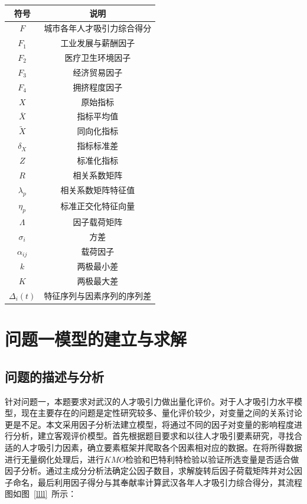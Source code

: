 \documentclass{whutmod}
\begin{document}
	\begin{table}[H]
	\label{biao} \centering
		\begin{tabular}{cc}
			\toprule[1.5pt]
			\multicolumn{1}{m{5cm}}{\centering 符号} & \multicolumn{1}{m{5cm}}{\centering 说明} \\
			\midrule[1pt]
			$F$	 &  城市各年人才吸引力综合得分  \\ 
			$F_{1}$ &  工业发展与薪酬因子 \\ 
			$F_{2}$	 &  医疗卫生环境因子 \\ 
			$F_{3}$  &  经济贸易因子 \\ 
			$F_{4}$  &  拥挤程度因子 \\ 
			$X$  &  原始指标 \\ 
			$\overline{X}$  &  指标平均值 \\ 
			$\widetilde{X}$  &  同向化指标 \\ 
	     	$\delta_{X}$  &  指标标准差 \\ 
	     	$Z$  & 标准化指标 \\ 
	     	$R$  & 相关系数矩阵 \\ 
	     	$\lambda_{p}$  & 相关系数矩阵特征值 \\ 
	     	$\eta _ {p}$  & 标准正交化特征向量 \\ 
	     	$\Lambda$ & 因子载荷矩阵 \\ 
	     	$\sigma_{i}$ & 方差 \\
	     	$\alpha_{i j}$ & 载荷因子 \\
	     	$k$ & 两极最小差 \\
	     	$K$ & 两极最大差 \\
	     	$\Delta _{i}(t)$ & 特征序列与因素序列的序列差 \\
			\bottomrule[1.5pt]
		\end{tabular}
	\end{table}

	\section{问题一模型的建立与求解}
	\subsection{问题的描述与分析}

	针对问题一，本题要求对武汉的人才吸引力做出量化评价。对于人才吸引力水平模型，现在主要存在的问题是定性研究较多、量化评价较少，对变量之间的关系讨论更是不足。本文采用因子分析法建立模型，将通过不同的因子对变量的影响程度进行分析，建立客观评价模型。首先根据题目要求和以往人才吸引要素研究，寻找合适的人才吸引力因素，确立要素框架并爬取各个因素相对应的数据。在将所得数据进行无量纲化处理后，进行$KMO$检验和巴特利特检验以验证所选变量是否适合做因子分析。通过主成分分析法确定公因子数目，求解旋转后因子荷载矩阵并对公因子命名，最后利用因子得分与其奉献率计算武汉各年人才吸引力综合得分，其流程图如图~\ref{llll}~所示：
\end{document}
